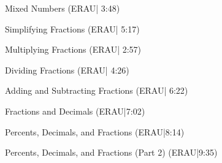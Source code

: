 \documentclass{ximera}
\begin{document}

Mixed Numbers (ERAU| 3:48)


Simplifying Fractions (ERAU| 5:17)


Multiplying Fractions (ERAU| 2:57)


Dividing Fractions (ERAU| 4:26)


Adding and Subtracting Fractions (ERAU| 6:22)


Fractions and Decimals (ERAU|7:02)


Percents, Decimals, and Fractions (ERAU|8:14)


Percents, Decimals, and Fractions (Part 2) (ERAU|9:35)

\end{document}
